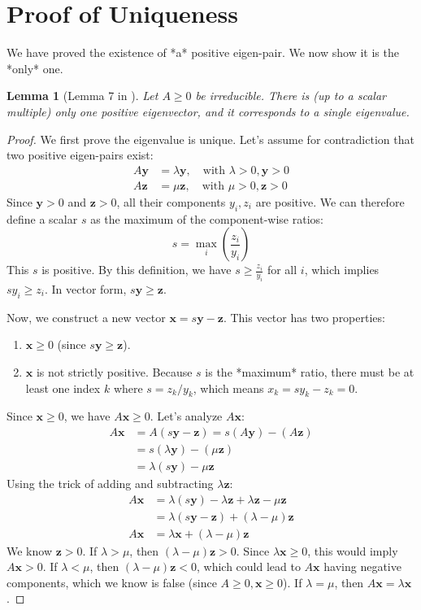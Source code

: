 \documentclass[12pt,a4paper]{report}
\theoremstyle{plain}
\newtheorem{lemma}[theorem]{Lemma}
\theoremstyle{definition}
\theoremstyle{remark}
\begin{document}
\section{Proof of Uniqueness}
We have proved the existence of *a* positive eigen-pair. We now show it is the *only* one.

\begin{lemma}[Lemma 7 in \cite{main_paper}]\label{lem:pf_uniqueness}
Let $A \ge 0$ be irreducible. There is (up to a scalar multiple) only one positive eigenvector, and it corresponds to a single eigenvalue.
\end{lemma}
\begin{proof}
We first prove the eigenvalue is unique. Let's assume for contradiction that two positive eigen-pairs exist:
\begin{align*}
    A\bm{y} &= \lambda \bm{y}, \quad \text{with } \lambda > 0, \bm{y} > 0 \\
    A\bm{z} &= \mu \bm{z}, \quad \text{with } \mu > 0, \bm{z} > 0
\end{align*}
Since $\bm{y} > 0$ and $\bm{z} > 0$, all their components $y_i, z_i$ are positive. We can therefore define a scalar $s$ as the maximum of the component-wise ratios:
$$ s = \max_{i} \left( \frac{z_i}{y_i} \right) $$
This $s$ is positive. By this definition, we have $s \ge \frac{z_i}{y_i}$ for all $i$, which implies $s y_i \ge z_i$. In vector form, $s\bm{y} \ge \bm{z}$.

Now, we construct a new vector $\bm{x} = s\bm{y} - \bm{z}$. This vector has two properties:
\begin{enumerate}
    \item $\bm{x} \ge 0$ (since $s\bm{y} \ge \bm{z}$).
    \item $\bm{x}$ is not strictly positive. Because $s$ is the *maximum* ratio, there must be at least one index $k$ where $s = z_k/y_k$, which means $x_k = s y_k - z_k = 0$.
\end{enumerate}
Since $\bm{x} \ge 0$, we have $A\bm{x} \ge 0$. Let's analyze $A\bm{x}$:
\begin{align*}
    A\bm{x} &= A(s\bm{y} - \bm{z}) = s(A\bm{y}) - (A\bm{z}) \\
            &= s(\lambda \bm{y}) - (\mu \bm{z}) \\
            &= \lambda(s\bm{y}) - \mu \bm{z}
\end{align*}
Using the trick of adding and subtracting $\lambda \bm{z}$:
\begin{align*}
    A\bm{x} &= \lambda(s\bm{y}) - \lambda \bm{z} + \lambda \bm{z} - \mu \bm{z} \\
            &= \lambda(s\bm{y} - \bm{z}) + (\lambda - \mu)\bm{z} \\
    A\bm{x} &= \lambda \bm{x} + (\lambda - \mu)\bm{z}
\end{align*}
We know $\bm{z} > 0$. If $\lambda > \mu$, then $(\lambda - \mu)\bm{z} > 0$. Since $\lambda \bm{x} \ge 0$, this would imply $A\bm{x} > 0$.
If $\lambda < \mu$, then $(\lambda - \mu)\bm{z} < 0$, which could lead to $A\bm{x}$ having negative components, which we know is false (since $A \ge 0, \bm{x} \ge 0$).
If $\lambda = \mu$, then $A\bm{x} = \lambda \bm{x}$.


\end{proof}
\end{document}
